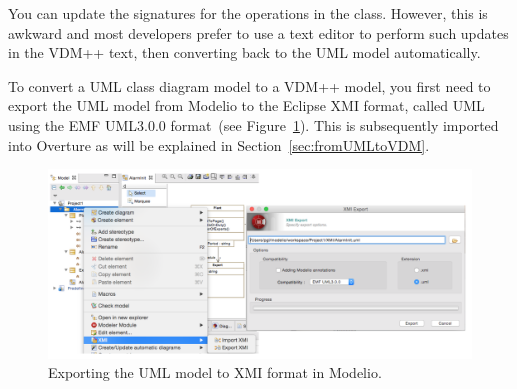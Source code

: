 You can update the signatures for the operations in the  class. However, this is awkward and most developers prefer to use a text editor to perform such updates in the VDM++ text, then converting back to the UML model automatically.

To convert a UML class diagram model to a VDM++ model, you first need to export the UML model from Modelio to the Eclipse XMI format, called UML using the EMF UML3.0.0 format~(see Figure~\ref{fig:xmiexportmodelio}). This is subsequently imported into Overture as will be explained in Section~\ref{sec:fromUMLtoVDM}.
%
\begin{figure}[htbp]
\begin{center}
\includegraphics[width=4.5in]{figures/xmiexportmodelio}
\caption{Exporting the UML model to XMI format in Modelio.\label{fig:xmiexportmodelio}}
\end{center}
\end{figure}
%



